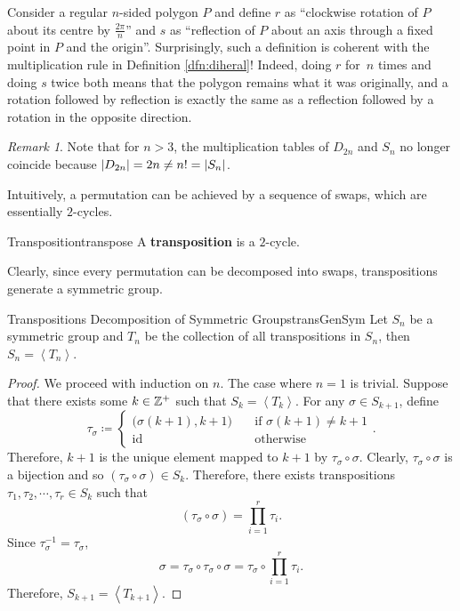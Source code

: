 \documentclass[math]{amznotes}
\theoremstyle{remark}
\newtheorem*{remark}{Remark}
\newcommand{\0}{\mathbf{0}}
\newcommand{\1}{\mathbf{1}}
\begin{document}
Consider a regular $n$-sided polygon $P$ and define $r$ as ``clockwise rotation of $P$ about its centre by $\frac{2\pi}{n}$'' and $s$ as ``reflection of $P$ about an axis through a fixed point in $P$ and the origin''. Surprisingly, such a definition is coherent with the multiplication rule in Definition \ref{dfn:diheral}! Indeed, doing $r$ for~$n$ times and doing $s$ twice both means that the polygon remains what it was originally, and a rotation followed by reflection is exactly the same as a reflection followed by a rotation in the opposite direction.
\begin{notebox}
    \begin{remark}
        Note that for $n > 3$, the multiplication tables of $D_{2n}$ and $S_n$ no longer coincide because ${\left\lvert {D_{2n}} \right\rvert} = 2n \neq n! = {\left\lvert {S_n} \right\rvert}$.
    \end{remark}
\end{notebox}
Intuitively, a permutation can be achieved by a sequence of swaps, which are essentially $2$-cycles.
\begin{dfnbox}{Transposition}{transpose}
    A {\color{red} \textbf{transposition}} is a $2$-cycle.
\end{dfnbox}
Clearly, since every permutation can be decomposed into swaps, transpositions generate a symmetric group.
\begin{probox}{Transpositions Decomposition of Symmetric Groups}{transGenSym}
    Let $S_n$ be a symmetric group and $T_n$ be the collection of all transpositions in $S_n$, then $S_n = \left\langle T_n \right\rangle$.
    \tcblower
    \begin{proof}
        We proceed with induction on $n$. The case where $n = 1$ is trivial. Suppose that there exists some $k \in \mathbb{Z}^+$ such that $S_k = \left\langle T_k\right\rangle$. For any $\sigma \in S_{k + 1}$, define 
        \begin{equation*}
            \tau_{\sigma} \coloneqq \begin{cases}
                \bigl(\sigma\left(k + 1\right), k + 1\bigr) & \quad\textrm{if } \sigma\left(k + 1\right) \neq k + 1 \\
                \mathrm{id} & \quad\textrm{otherwise}
            \end{cases}.
        \end{equation*}
        Therefore, $k + 1$ is the unique element mapped to $k + 1$ by $\tau_{\sigma} \circ \sigma$. Clearly, $\tau_{\sigma} \circ \sigma$ is a bijection and so $\left(\tau_{\sigma} \circ \sigma\right) \in S_k$. Therefore, there exists transpositions $\tau_1, \tau_2, \cdots, \tau_r \in S_{k}$ such that 
        \begin{equation*}
            \left(\tau_{\sigma} \circ \sigma\right) = \prod_{i = 1}^r \tau_i.
        \end{equation*}
        Since $\tau_{\sigma}^{-1} = \tau_{\sigma}$, 
        \begin{equation*}
            \sigma = \tau_{\sigma} \circ \tau_{\sigma} \circ \sigma = \tau_{\sigma} \circ \prod_{i = 1}^r \tau_i.
        \end{equation*}
        Therefore, $S_{k + 1} = \left\langle T_{k + 1} \right\rangle$.
    \end{proof}
\end{probox}
\end{document}
